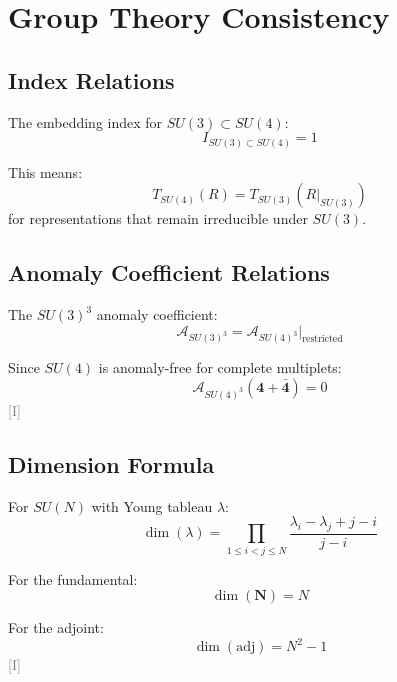 \documentclass[11pt,a4paper]{article}
\newcommand{\tagI}{\textcolor{gray}{[I]}}
\begin{document}
\section{Group Theory Consistency}
\label{app:group}

\subsection{Index Relations}

The embedding index for $SU(3) \subset SU(4)$:
\begin{equation}
\label{eq:embed-index}
I_{SU(3) \subset SU(4)} = 1
\end{equation}

This means:
\begin{equation}
\label{eq:index-relation}
T_{SU(4)}(R) = T_{SU(3)}(R|_{SU(3)})
\end{equation}
for representations that remain irreducible under $SU(3)$.

\subsection{Anomaly Coefficient Relations}

The $SU(3)^3$ anomaly coefficient:
\begin{equation}
\label{eq:A-su3-from-su4}
\mathcal{A}_{SU(3)^3} = \mathcal{A}_{SU(4)^3}|_{\text{restricted}}
\end{equation}

Since $SU(4)$ is anomaly-free for complete multiplets:
\begin{equation}
\label{eq:su4-safe}
\mathcal{A}_{SU(4)^3}(\mathbf{4} + \bar{\mathbf{4}}) = 0
\end{equation}
\tagI

\subsection{Dimension Formula}

For $SU(N)$ with Young tableau $\lambda$:
\begin{equation}
\label{eq:dim-formula}
\dim(\lambda) = \prod_{1 \leq i < j \leq N} \frac{\lambda_i - \lambda_j + j - i}{j - i}
\end{equation}

For the fundamental:
\begin{equation}
\label{eq:dim-fund-formula}
\dim(\mathbf{N}) = N
\end{equation}

For the adjoint:
\begin{equation}
\label{eq:dim-adj-formula}
\dim(\text{adj}) = N^2 - 1
\end{equation}
\tagI
\end{document}

